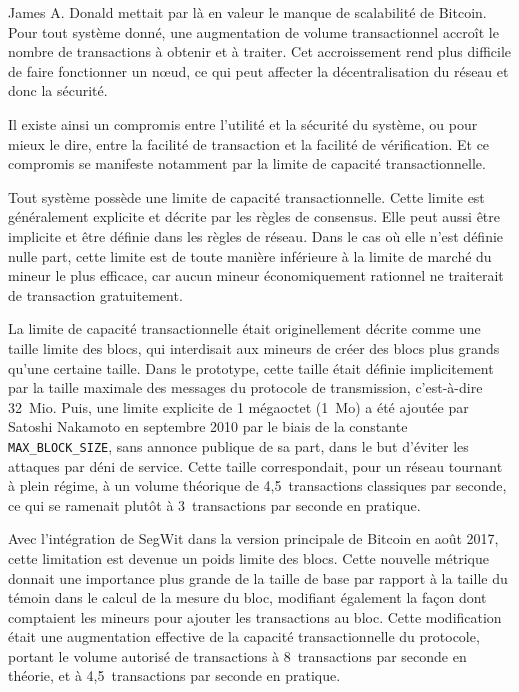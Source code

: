 James A. Donald mettait par là en valeur le manque de scalabilité de Bitcoin. Pour tout système donné, une augmentation de volume transactionnel accroît le nombre de transactions à obtenir et à traiter. Cet accroissement rend plus difficile de faire fonctionner un nœud, ce qui peut affecter la décentralisation du réseau et donc la sécurité.

Il existe ainsi un compromis entre l'utilité et la sécurité du système, ou pour mieux le dire, entre la facilité de transaction et la facilité de vérification. Et ce compromis se manifeste notamment par la limite de capacité transactionnelle.

Tout système possède une limite de capacité transactionnelle. Cette limite est généralement explicite et décrite par les règles de consensus. Elle peut aussi être implicite et être définie dans les règles de réseau. Dans le cas où elle n'est définie nulle part, cette limite est de toute manière inférieure à la limite de marché du mineur le plus efficace, car aucun mineur économiquement rationnel ne traiterait de transaction gratuitement.

La limite de capacité transactionnelle était originellement décrite comme une taille limite des blocs, qui interdisait aux mineurs de créer des blocs plus grands qu'une certaine taille. Dans le prototype, cette taille était définie implicitement par la taille maximale des messages du protocole de transmission, c'est-à-dire 32~Mio. Puis, une limite explicite de 1 mégaoctet (1~Mo) a été ajoutée par Satoshi Nakamoto en septembre 2010 par le biais de la constante \texttt{MAX\_BLOCK\_SIZE}, sans annonce publique de sa part, dans le but d'éviter les attaques par déni de service. Cette taille correspondait, pour un réseau tournant à plein régime, à un volume théorique de 4,5~transactions classiques par seconde, ce qui se ramenait plutôt à 3~transactions par seconde en pratique. %

Avec l'intégration de SegWit dans la version principale de Bitcoin en août 2017, cette limitation est devenue un poids limite des blocs. Cette nouvelle métrique donnait une importance plus grande de la taille de base par rapport à la taille du témoin dans le calcul de la mesure du bloc, modifiant également la façon dont comptaient les mineurs pour ajouter les transactions au bloc. Cette modification était une augmentation effective de la capacité transactionnelle du protocole, portant le volume autorisé de transactions à 8~transactions par seconde en théorie, et à 4,5~transactions par seconde en pratique. %

